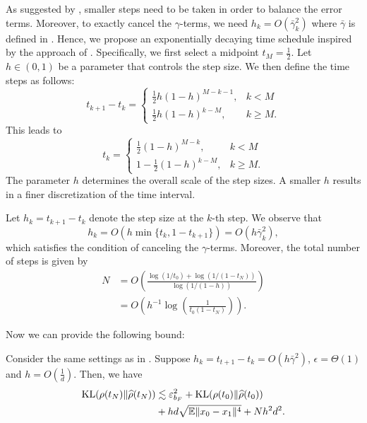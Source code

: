 As suggested by , smaller steps need to be taken in order to balance the error terms. Moreover, to exactly cancel the $\gamma$-terms, we need $h_k=O(\bar{\gamma}_k^2)$ where $\bar{\gamma}$ is defined in . Hence, we propose an exponentially decaying time schedule inspired by the approach of \citet{dlinear}. %
Specifically, we first select a midpoint $t_M=\frac{1}{2}$. Let $h\in(0,1)$ be a parameter that controls the step size. We then define the time steps as follows:
$$t_{k+1}-t_k=\begin{cases}\frac{1}{2}h(1-h)^{M-k-1},&k<M\\\frac{1}{2}h(1-h)^{k-M},&k\ge M.\end{cases}$$
This leads to $$t_k=\begin{cases}
    \frac{1}{2}(1-h)^{M-k},&k<M\\
    1-\frac{1}{2}(1-h)^{k-M},&k\ge M.
\end{cases}$$
The parameter $h$ determines the overall scale of the step sizes. A smaller $h$ results in a finer discretization of the time interval. 

Let $h_k=t_{k+1}-t_k$ denote the step size at the $k$-th step. We observe that $$h_k=O(h\min\{t_k,1-t_{k+1}\})=O(h\bar{\gamma}_k^2),$$
which satisfies the condition of canceling the $\gamma$-terms.
Moreover, the total number of steps is given by
$$\begin{aligned}
    N&=O\left(\frac{\log(1/t_0)+\log(1/(1-t_N))}{\log(1/(1-h))}\right)\\
    &=O\left(h^{-1}\log\left(\frac{1}{t_0(1-t_N)}\right)\right).
\end{aligned}$$

Now we can provide the following bound:

\begin{proposition}
    Consider the same settings as in . Suppose $h_k=t_{t+1}-t_k=O(h\bar{\gamma}^2)$, $\epsilon=\Theta(1)$ and $h=O(\frac{1}{d})$. %
    Then, we have
    $$\begin{aligned}
        \textnormal{KL}(\rho(t_N)\Vert\hat{\rho}(t_N))&\lesssim\varepsilon_{b_F}^2+\textnormal{KL}(\rho(t_0)\Vert\hat{\rho}(t_0))\\
        &+hd\sqrt{\mathbb{E}\Vert x_0-x_1\Vert^4}+Nh^2d^2.
    \end{aligned}$$
    \label{cor:schedule}
\end{proposition}

